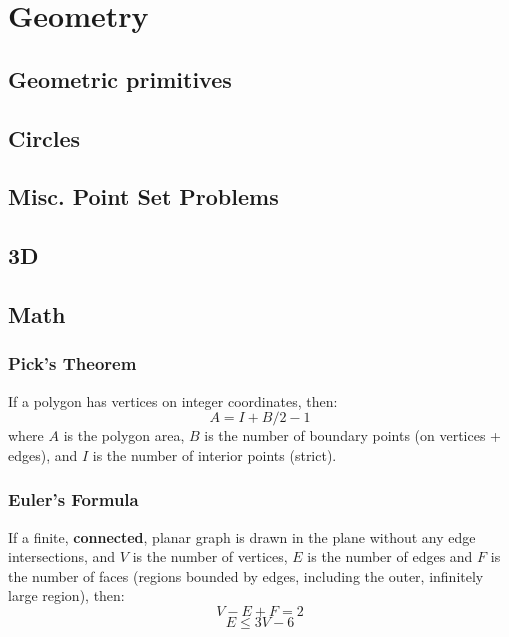 \chapter{Geometry}

\section{Geometric primitives}

\section{Circles}

\section{Misc. Point Set Problems}

\section{3D}


\section{Math}
    \subsection{Pick's Theorem}
    If a polygon has vertices on integer coordinates, then: 
    $$A = I + B/2 - 1$$
    where $A$ is the polygon area, $B$ is 
    the number of boundary points (on vertices + edges), and 
    $I$ is the number of interior points (strict).
    
    \subsection{Euler's Formula}
    If a finite, \textbf{connected}, planar graph is drawn in 
    the plane without any edge intersections, and $V$ is the 
    number of vertices, $E$ is the number of edges and $F$ is 
    the number of faces (regions bounded by edges, including 
    the outer, infinitely large region), then: 
    $$V - E + F = 2$$
    $$E \leq 3V-6$$